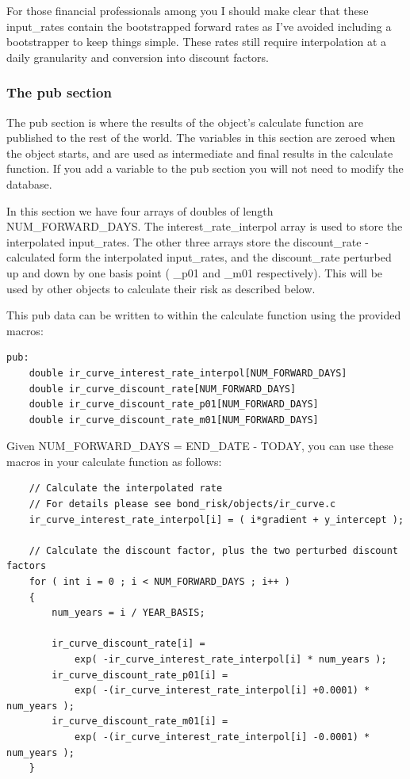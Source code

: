 \documentclass{report}
\begin{document}
For those financial professionals among you I should make clear that these input_rates contain the bootstrapped forward rates as I've avoided including a bootstrapper to keep things simple. These rates still require interpolation at a daily granularity and conversion into discount factors.

\subsubsection{The pub section}

The pub section is where the results of the object's calculate function are published to the rest of the world. The variables in this section are zeroed when the object starts, and are used as intermediate and final results in the calculate function. If you add a variable to the pub section you will not need to modify the database.  

In this section we have four arrays of doubles of length NUM_FORWARD_DAYS. The interest_rate_interpol array is used to store the interpolated input_rates. The other three arrays store the discount_rate - calculated form the interpolated input_rates, and the discount_rate perturbed up and down by one basis point ( _p01 and _m01 respectively). This will be used by other objects to calculate their risk as described below. 

This pub data can be written to within the calculate function using the provided macros:
\begin{verbatim}
pub:
    double ir_curve_interest_rate_interpol[NUM_FORWARD_DAYS]
    double ir_curve_discount_rate[NUM_FORWARD_DAYS]
    double ir_curve_discount_rate_p01[NUM_FORWARD_DAYS]
    double ir_curve_discount_rate_m01[NUM_FORWARD_DAYS]
\end{verbatim}

Given NUM_FORWARD_DAYS = END_DATE - TODAY, you can use these macros in your calculate function as follows:

\begin{verbatim}
    // Calculate the interpolated rate
    // For details please see bond_risk/objects/ir_curve.c
    ir_curve_interest_rate_interpol[i] = ( i*gradient + y_intercept );

    // Calculate the discount factor, plus the two perturbed discount factors
    for ( int i = 0 ; i < NUM_FORWARD_DAYS ; i++ )
    {
        num_years = i / YEAR_BASIS;

        ir_curve_discount_rate[i] = 
            exp( -ir_curve_interest_rate_interpol[i] * num_years );
        ir_curve_discount_rate_p01[i] = 
            exp( -(ir_curve_interest_rate_interpol[i] +0.0001) * num_years );
        ir_curve_discount_rate_m01[i] = 
            exp( -(ir_curve_interest_rate_interpol[i] -0.0001) * num_years );
    }
\end{verbatim}
\end{document}
